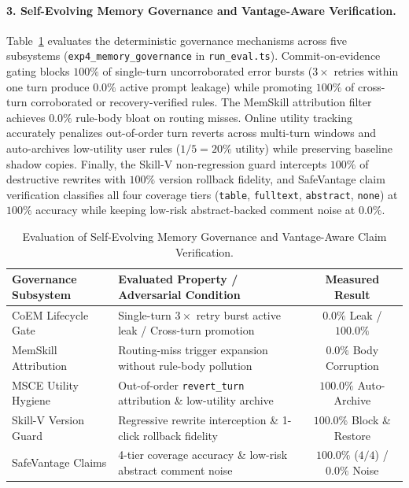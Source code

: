 \documentclass[11pt,a4paper]{article}
\begin{document}
\paragraph{3. Self-Evolving Memory Governance and Vantage-Aware Verification.}
Table~\ref{tab:memory_governance} evaluates the deterministic governance mechanisms across five subsystems (\texttt{exp4\_memory\_governance} in \texttt{run\_eval.ts}). Commit-on-evidence gating blocks $100\%$ of single-turn uncorroborated error bursts ($3\times$ retries within one turn produce $0.0\%$ active prompt leakage) while promoting $100\%$ of cross-turn corroborated or recovery-verified rules. The MemSkill attribution filter achieves $0.0\%$ rule-body bloat on routing misses. Online utility tracking accurately penalizes out-of-order turn reverts across multi-turn windows and auto-archives low-utility user rules ($1/5 = 20\%$ utility) while preserving baseline shadow copies. Finally, the Skill-V non-regression guard intercepts $100\%$ of destructive rewrites with $100\%$ version rollback fidelity, and SafeVantage claim verification classifies all four coverage tiers (\texttt{table}, \texttt{fulltext}, \texttt{abstract}, \texttt{none}) at $100\%$ accuracy while keeping low-risk abstract-backed comment noise at $0.0\%$.

\begin{table}[!t]
\centering
\caption{Evaluation of Self-Evolving Memory Governance and Vantage-Aware Claim Verification.}
\label{tab:memory_governance}
\vspace{2pt}
\small
\setlength{\tabcolsep}{0pt}
\begin{tabular*}{\textwidth}{@{\extracolsep{\fill}}llc@{}}
\toprule
\textbf{Governance Subsystem} & \textbf{Evaluated Property / Adversarial Condition} & \textbf{Measured Result} \\
\midrule
CoEM Lifecycle Gate \cite{coem2026} & Single-turn $3\times$ retry burst active leak / Cross-turn promotion & $\mathbf{0.0\%}$ Leak / $\mathbf{100.0\%}$ \\
MemSkill Attribution \cite{memskill2026} & Routing-miss trigger expansion without rule-body pollution & $\mathbf{0.0\%}$ Body Corruption \\
MSCE Utility Hygiene \cite{msce2026} & Out-of-order \texttt{revert\_turn} attribution \& low-utility archive & $\mathbf{100.0\%}$ Auto-Archive \\
Skill-V Version Guard \cite{skillv2026} & Regressive rewrite interception \& 1-click rollback fidelity & $\mathbf{100.0\%}$ Block \& Restore \\
SafeVantage Claims \cite{safevantage2026} & 4-tier coverage accuracy \& low-risk abstract comment noise & $\mathbf{100.0\%}$ ($4/4$) / $\mathbf{0.0\%}$ Noise \\
\bottomrule
\end{tabular*}
\end{table}
\end{document}
